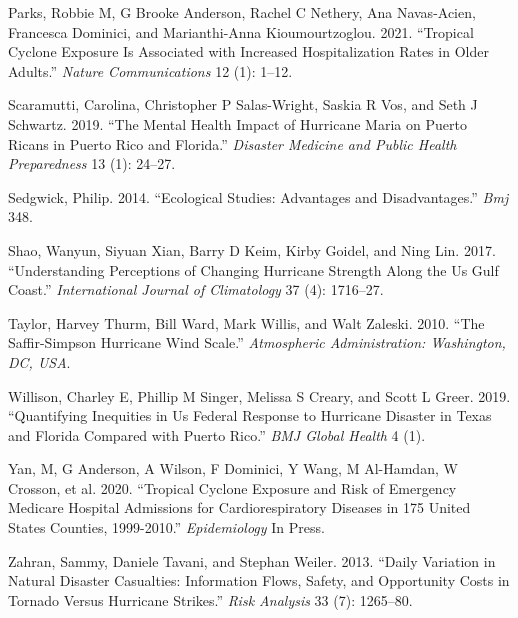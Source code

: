 \documentclass[
]{article}
\begin{document}
\leavevmode\hypertarget{ref-parks2021tropical}{}%
Parks, Robbie M, G Brooke Anderson, Rachel C Nethery, Ana Navas-Acien,
Francesca Dominici, and Marianthi-Anna Kioumourtzoglou. 2021. ``Tropical
Cyclone Exposure Is Associated with Increased Hospitalization Rates in
Older Adults.'' \emph{Nature Communications} 12 (1): 1--12.

\leavevmode\hypertarget{ref-scaramutti2019mental}{}%
Scaramutti, Carolina, Christopher P Salas-Wright, Saskia R Vos, and Seth
J Schwartz. 2019. ``The Mental Health Impact of Hurricane Maria on
Puerto Ricans in Puerto Rico and Florida.'' \emph{Disaster Medicine and
Public Health Preparedness} 13 (1): 24--27.

\leavevmode\hypertarget{ref-sedgwick2014ecological}{}%
Sedgwick, Philip. 2014. ``Ecological Studies: Advantages and
Disadvantages.'' \emph{Bmj} 348.

\leavevmode\hypertarget{ref-shao2017understanding}{}%
Shao, Wanyun, Siyuan Xian, Barry D Keim, Kirby Goidel, and Ning Lin.
2017. ``Understanding Perceptions of Changing Hurricane Strength Along
the Us Gulf Coast.'' \emph{International Journal of Climatology} 37 (4):
1716--27.

\leavevmode\hypertarget{ref-taylor2010saffir}{}%
Taylor, Harvey Thurm, Bill Ward, Mark Willis, and Walt Zaleski. 2010.
``The Saffir-Simpson Hurricane Wind Scale.'' \emph{Atmospheric
Administration: Washington, DC, USA}.

\leavevmode\hypertarget{ref-willison2019quantifying}{}%
Willison, Charley E, Phillip M Singer, Melissa S Creary, and Scott L
Greer. 2019. ``Quantifying Inequities in Us Federal Response to
Hurricane Disaster in Texas and Florida Compared with Puerto Rico.''
\emph{BMJ Global Health} 4 (1).

\leavevmode\hypertarget{ref-yan2020tropical}{}%
Yan, M, G Anderson, A Wilson, F Dominici, Y Wang, M Al-Hamdan, W
Crosson, et al. 2020. ``Tropical Cyclone Exposure and Risk of Emergency
Medicare Hospital Admissions for Cardiorespiratory Diseases in 175
United States Counties, 1999-2010.'' \emph{Epidemiology} In Press.

\leavevmode\hypertarget{ref-zahran2013daily}{}%
Zahran, Sammy, Daniele Tavani, and Stephan Weiler. 2013. ``Daily
Variation in Natural Disaster Casualties: Information Flows, Safety, and
Opportunity Costs in Tornado Versus Hurricane Strikes.'' \emph{Risk
Analysis} 33 (7): 1265--80.
\end{document}
